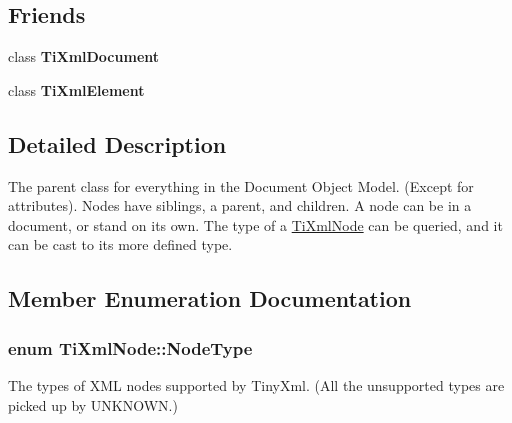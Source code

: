 \subsection*{\-Friends}
\begin{DoxyCompactItemize}
\item 
\hypertarget{class_ti_xml_node_a173617f6dfe902cf484ce5552b950475}{class {\bfseries \-Ti\-Xml\-Document}}\label{class_ti_xml_node_a173617f6dfe902cf484ce5552b950475}

\item 
\hypertarget{class_ti_xml_node_ab6592e32cb9132be517cc12a70564c4b}{class {\bfseries \-Ti\-Xml\-Element}}\label{class_ti_xml_node_ab6592e32cb9132be517cc12a70564c4b}

\end{DoxyCompactItemize}


\subsection{\-Detailed \-Description}
\-The parent class for everything in the \-Document \-Object \-Model. (\-Except for attributes). \-Nodes have siblings, a parent, and children. \-A node can be in a document, or stand on its own. \-The type of a \hyperlink{class_ti_xml_node}{\-Ti\-Xml\-Node} can be queried, and it can be cast to its more defined type. 

\subsection{\-Member \-Enumeration \-Documentation}
\hypertarget{class_ti_xml_node_a836eded4920ab9e9ef28496f48cd95a2}{
\subsubsection[{\-Node\-Type}]{\setlength{\rightskip}{0pt plus 5cm}enum {\bf \-Ti\-Xml\-Node\-::\-Node\-Type}}}\label{class_ti_xml_node_a836eded4920ab9e9ef28496f48cd95a2}
\-The types of \-X\-M\-L nodes supported by \-Tiny\-Xml. (\-All the unsupported types are picked up by \-U\-N\-K\-N\-O\-W\-N.) 

